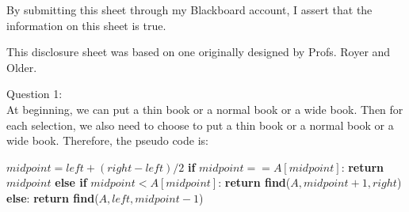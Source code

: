 \documentclass[12pt]{article}
\begin{document}
\vspace*{40ex}

By submitting this sheet through my Blackboard account, I assert that the information on this sheet is true.


\hfill {\tiny This disclosure sheet was based on one originally designed
  by
  Profs. Royer and Older.}


\pagebreak
\noindent
\large Question 1: \vspace{5mm} \\
\normalsize 
At beginning, we can put a thin book or a normal book or a wide book. Then for each selection, we also need to choose to put a thin book or a normal book or a wide book. Therefore, the pseudo code is: \\
\begin{algorithm}
\begin{algorithmic}
  \State \textbf{}$midpoint = left + (right - left) / 2$
  \State \textbf{if} $midpoint == A[midpoint]$:
  \State \hspace{0.8cm}  \textbf{return} $midpoint$
  \State \textbf{else if} $midpoint < A[midpoint]$:
  \State \hspace{0.8cm}  \textbf{return find}($A, midpoint+1, right$)
  \State \textbf{else}:
  \State \hspace{0.8cm} \textbf{return find}($A, left, midpoint-1$)
\EndFunction
\end{algorithmic}
\end{algorithm}\\
\end{document}
